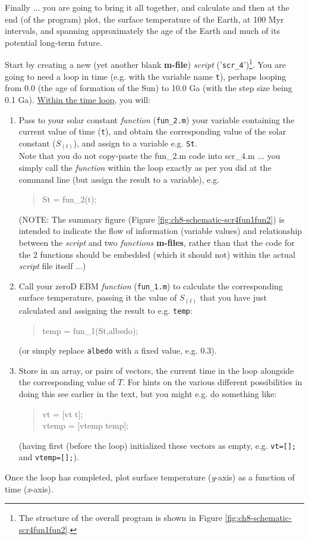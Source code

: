 \documentclass{tufte-book} %
\newenvironment{docspec}{\begin{quotation}\ttfamily\parskip0pt\parindent0pt\ignorespaces}{\end{quotation}}
\begin{document}
Finally ... you are going to bring it all together, and calculate and then at the end (of the program) plot,  the surface temperature of the Earth, at 100 Myr intervals, and spanning approximately the age of the Earth and much of its potential long-term future.

Start by creating a new (yet another blank \textbf{m-file}) \textit{script} ('\texttt{scr\_4}')\footnote{The structure of the overall program is shown in  Figure \ref{fig:ch8-schematic-scr4fun1fun2}.}. You are going to need a loop in time (e.g. with the variable name \texttt{t}), perhaps looping from 0.0 (the age of formation of the Sun) to 10.0 Ga (with the step size being 0.1 Ga). \uline{Within the time loop}, you will:

\begin{enumerate}[noitemsep]
\setlength{\itemindent}{.2in}
\item Pass to your solar constant \textit{function} (\texttt{fun\_2.m}) your  variable containing the current value of time (\texttt{t}), and obtain the corresponding value of the solar constant (\(S_{(t)}\)), and assign to a variable e.g. \texttt{St}.
\\Note that you do not copy-paste the \textsf{fun\_2.m} code into \textsf{scr\_4.m} ... you simply call the \textit{function} within the loop exactly as per you did at the command line (but assign the result to a variable), e.g.
\begin{docspec}
St = fun\_2(t);
\end{docspec}
(NOTE: The summary figure (Figure \ref{fig:ch8-schematic-scr4fun1fun2}) is intended to indicate the flow of information (variable values) and relationship between the \textit{script} and two \textit{functions} \textbf{m-files}, rather than that the code for the 2 functions should be embedded (which it should not) within the actual \textit{script} file itself ...)
\item  Call your zeroD EBM \textit{function} (\texttt{fun\_1.m}) to calculate the corresponding surface temperature, passing it the value of \(S_{(t)}\) that you have just calculated and assigning the result to  e.g. \texttt{temp}:
\begin{docspec}
temp = fun\_1(St,albedo);
\end{docspec}
(or simply replace \texttt{albedo} with a fixed value, e.g. 0.3).
\item Store in an array, or pairs of vectors, the current time in the loop alongside the corresponding value of \(T\). For hints on the various different possibilities in doing this see earlier in the text, but you might e.g. do something like:
\begin{docspec}
vt = [vt t];\\
vtemp = [vtemp temp];
\end{docspec}
(having first (before the loop) initialized these vectors as empty, e.g. \texttt{vt=[];} and \texttt{vtemp=[];}).
\end{enumerate}
\vspace{-1mm}
Once the loop has completed, plot surface temperature (\textit{y}-axis) as a function of time (\textit{x}-axis).
\end{document}
